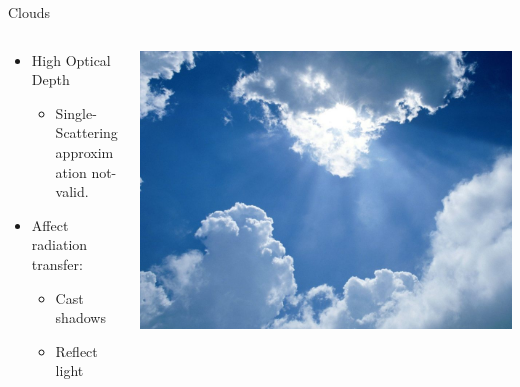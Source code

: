 \documentclass[compress,red,12pt]{beamer}
\begin{document}
\begin{frame}{Clouds}
  \begin{columns}[T]
    \begin{column}{.6\textwidth}
      \begin{itemize}
      \item High Optical Depth
        \begin{itemize}
        \item Single-Scattering approximation not-valid.
        \end{itemize}
      \item Affect radiation transfer:
        \begin{itemize}
        \item Cast shadows
        \item Reflect light
        \end{itemize}
      \end{itemize}
    \end{column}
    \begin{column}{.4\textwidth}
      \includegraphics[height=0.40\textheight]{clouds.jpg}
    \end{column}
  \end{columns}
\end{frame}

\end{document}
